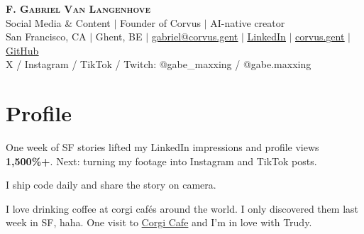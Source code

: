 \documentclass[letterpaper,11pt]{article}
\begin{document}
\begin{center}
\textbf{\Huge \scshape F. Gabriel Van Langenhove}\\[2pt]
Social Media \& Content $\vert$ Founder of Corvus $\vert$ AI-native creator\\
\small San Francisco, CA $\vert$ Ghent, BE $\vert$ \href{mailto:gabriel@corvus.gent}{\underline{gabriel@corvus.gent}} $\vert$ \href{https://www.linkedin.com/in/francisco-gabriel-van-langenhove}{\underline{LinkedIn}} $\vert$ \href{https://corvus.gent}{\underline{corvus.gent}} $\vert$ \href{https://github.com/gabriellvl}{\underline{GitHub}}\\
X / Instagram / TikTok / Twitch: @gabe\_maxxing / @gabe.maxxing
\end{center}
\small
\section{Profile}
One week of SF stories lifted my LinkedIn impressions and profile views \textbf{1,500\%+}. Next: turning my footage into Instagram and TikTok posts.\par
I ship code daily and share the story on camera.\par
I love drinking coffee at corgi cafés around the world. I only discovered them last week in SF, haha. One visit to \href{https://www.corgicafe.com/}{Corgi Cafe} and I'm in love with Trudy.\par
\end{document}
